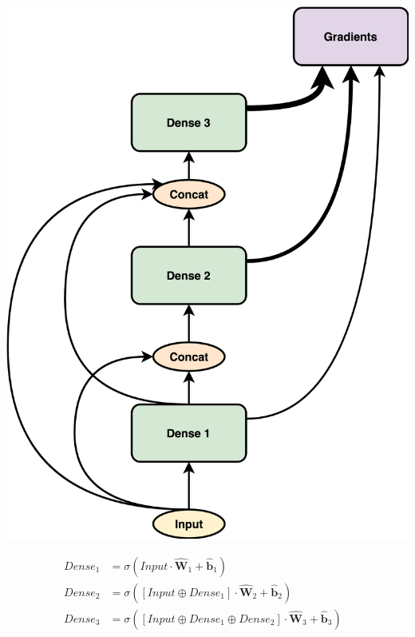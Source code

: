 \documentclass{article}
\let\oldhat\hat
\renewcommand{\hat}[1]{\oldhat{\mathbf{#1}}}
\begin{document}
\noindent\begin{minipage}{.45\textwidth}
   \centering
   \includegraphics[scale=0.09]{GSC.png}
   \label{fig:GSC.png}
\end{minipage}
\begin{minipage}{.45\textwidth}
\begin{equation}
\label{eq:gsc_math_representation}
\begin{aligned}
       Dense_{1} &= \sigma(Input \cdot \hat{W}_{1} + \hat{b}_{1}) &\\
       Dense_{2} &= \sigma([Input \oplus Dense_{1}] \cdot \hat{W}_{2} + \hat{b}_{2}) &\\
       Dense_{3} &= \sigma([Input \oplus Dense_{1} \oplus Dense_{2}] \cdot \hat{W}_{3} + \hat{b}_{3}) 
\end{aligned}
\end{equation}
\end{minipage}
\end{document}
